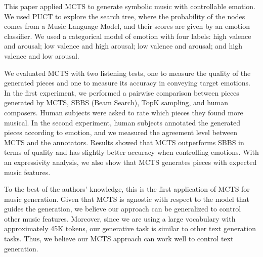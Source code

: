 This paper applied MCTS to generate symbolic music with controllable emotion. We used PUCT to explore the search tree, where the probability of the nodes comes from a Music Language Model, and their scores are given by an emotion classifier.
We used a categorical model of emotion with four labels: high valence and arousal; low valence and high arousal; low valence and arousal; and high valence and low arousal.

We evaluated MCTS with two listening tests, one to measure the quality of the generated pieces and one to measure its accuracy in conveying target emotions. In the first experiment, we performed a pairwise comparison between pieces generated by MCTS, SBBS (Beam Search),  TopK sampling, and human composers. Human subjects were asked to rate which pieces they found more musical. In the second experiment, human subjects annotated the generated pieces according to emotion, and we measured the agreement level between MCTS and the annotators. Results showed that MCTS outperforms SBBS in terms of quality and has slightly better accuracy when controlling emotions. With an expressivity analysis, we also show that MCTS generates pieces with expected music features.

To the best of the authors' knowledge, this is the first application of MCTS for music generation. Given that MCTS is agnostic with respect to the model that guides the generation, we believe our approach can be generalized to control other music features. Moreover, since we are using a large vocabulary with approximately 45K tokens, our generative task is similar to other text generation tasks. Thus, we believe our MCTS approach can work well to control text generation.
